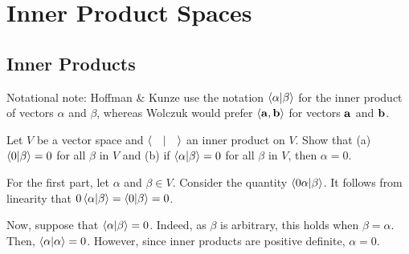 \documentclass{agony}
\begin{document}
\setcounter{section}{7}
\section{Inner Product Spaces}

\subsection{Inner Products}

Notational note: Hoffman \& Kunze use the notation $\ip{\alpha}{\beta}$ for the inner product of vectors $\alpha$ and $\beta$,
whereas Wolczuk would prefer $\ev{\vb{a}, \vb{b}}$ for vectors $\vb a$ and $\vb b$.

\begin{xca}
  Let $V$ be a vector space and $\ip{\quad}$ an inner product on $V$.
  Show that (a) $\ip{0}{\beta}=0$ for all $\beta$ in $V$ and (b) if $\ip{\alpha}{\beta} = 0$ for all $\beta$ in $V$, then $\alpha = 0$.
\end{xca}
\begin{prf}
  For the first part, let $\alpha$ and $\beta \in V$.
  Consider the quantity $\ip{0\alpha}{\beta}$.
  It follows from linearity that $0\ip{\alpha}{\beta} = \ip{0}{\beta} = 0$.

  Now, suppose that $\ip{\alpha}{\beta} = 0$.
  Indeed, as $\beta$ is arbitrary, this holds when $\beta = \alpha$.
  Then, $\ip{\alpha} = 0$.
  However, since inner products are positive definite, $\alpha = 0$.
\end{prf}
\end{document}

